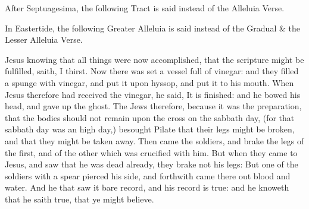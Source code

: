
\begin{rubric}
    After Septuagesima, the following Tract is said instead of the Alleluia Verse.
\end{rubric}


\clearpage
\begin{rubric}
    In Eastertide, the following Greater Alleluia is said instead of the Gradual \& the Lesser Alleluia Verse.
\end{rubric}


\vspace{-0.4\baselineskip}


\vspace{-0.2\baselineskip}

 Jesus knowing that all things were now accomplished, that the scripture might be fulfilled, saith, I thirst. Now there was set a vessel full of vinegar: and they filled a spunge with vinegar, and put it upon hyssop, and put it to his mouth. When Jesus therefore had received the vinegar, he said, It is finished: and he bowed his head, and gave up the ghost. The Jews therefore, because it was the preparation, that the bodies should not remain upon the cross on the sabbath day, (for that sabbath day was an high day,) besought Pilate that their legs might be broken, and that they might be taken away. Then came the soldiers, and brake the legs of the first, and of the other which was crucified with him. But when they came to Jesus, and saw that he was dead already, they brake not his legs: But one of the soldiers with a spear pierced his side, and forthwith came there out blood and water. And he that saw it bare record, and his record is true: and he knoweth that he saith true, that ye might believe.

